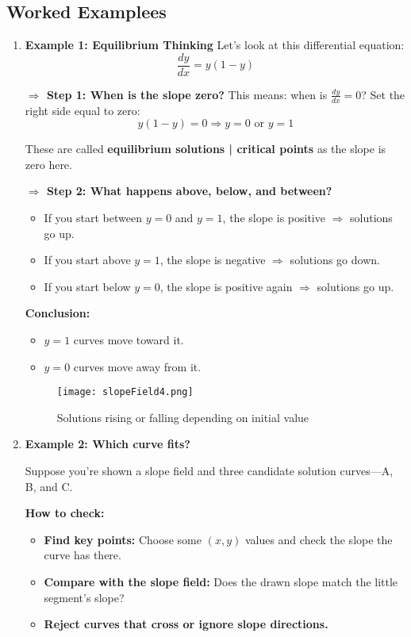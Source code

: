\documentclass{article}
\begin{document}
\subsection*{Worked Examplees}

\begin{enumerate}
  \item \textbf{Example 1: Equilibrium Thinking}  
Let’s look at this differential equation:  
\[
\frac{dy}{dx} = y(1 - y)
\]

\textbf{\(\Rightarrow\) Step 1: When is the slope zero?}  
This means: when is \(\frac{dy}{dx} = 0\)?  
Set the right side equal to zero:
\[
y(1 - y) = 0
\Rightarrow y = 0 \text{ or } y = 1
\]

These are called \textbf{equilibrium solutions | critical points} as the slope is zero here.

\textbf{\(\Rightarrow\) Step 2: What happens above, below, and between?}
\begin{itemize}
  \item If you start between \(y = 0\) and \(y = 1\), the slope is positive \(\Rightarrow\) solutions go up.
  \item If you start above \(y = 1\), the slope is negative \(\Rightarrow\) solutions go down.
  \item If you start below \(y = 0\), the slope is positive again \(\Rightarrow\) solutions go up.
\end{itemize}

\textbf{Conclusion:}
\begin{itemize}
  \item \(y = 1\) curves move toward it.
  \item \(y = 0\) curves move away from it.
\end{itemize}

  \vspace{10pt}
  \begin{figure}[h]
  \centering
  \caption{Solutions rising or falling depending on initial value}
  \texttt{[image: slopeField4.png]}
  \end{figure}
  \item \textbf{Example 2: Which curve fits?}

  Suppose you're shown a slope field and three candidate solution curves—A, B, and C.

  \textbf{How to check:}
  \begin{itemize}
    \item \textbf{Find key points:} Choose some \((x, y)\) values and check the slope the curve has there.
    \item \textbf{Compare with the slope field:} Does the drawn slope match the little segment's slope?
    \item \textbf{Reject curves that cross or ignore slope directions.}
  \end{itemize}


\end{enumerate}
\end{document}
